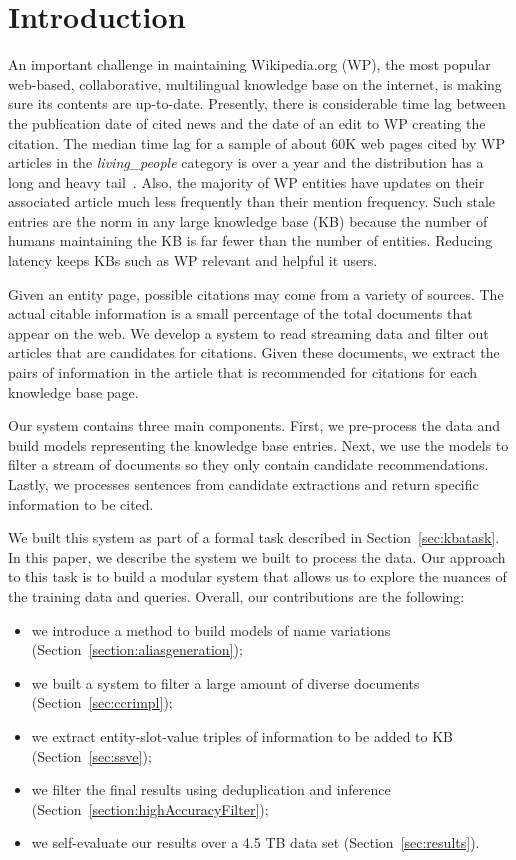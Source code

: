 
\section{Introduction}


An important challenge in maintaining Wikipedia.org (WP), the most popular 
web-based, collaborative, multilingual knowledge base on the internet, is  
making sure its contents are up-to-date. Presently, there is considerable time lag 
between the publication date of cited news and the date of an edit to WP 
creating the citation. The median time lag for a sample of about 60K
web pages cited by WP articles in the \textit{living\_people} category is over 
a year and the distribution has a long and heavy tail~\cite{JFrank12}. 
Also, the majority of WP entities have updates on their associated article much 
less frequently than their mention frequency. Such stale entries 
are the norm in any large knowledge base (KB) because the number of humans 
maintaining the KB is far fewer than the number of entities. 
Reducing latency keeps KBs such as WP relevant and helpful it users.

Given an entity page, possible citations may come from a variety of sources.
The actual citable information is a small percentage of the total documents that appear on the web.
We develop a system to read streaming data and filter out articles that are candidates for citations.
Given these documents, we extract the pairs of information in the 
article that is recommended for citations for each knowledge base page.

Our system contains three main components. First, we pre-process the data and
build models representing the knowledge base entries.
Next, we use the models to filter a stream of documents so they only contain 
candidate recommendations.
Lastly, we processes sentences from candidate extractions and return 
specific information to be cited.


We built this system as part of a formal task described in Section~\ref{sec:kbatask}.
In this paper, we describe the system we built to process the data.
Our approach to this task is to build a modular system
that allows us to explore the nuances of the training data and queries.
Overall, our contributions are the following:
\begin{itemize}[noitemsep,nolistsep]
\item we introduce a method to build models of name variations (Section~\ref{section:aliasgeneration});
\item we built a system to filter a large amount of diverse documents (Section~\ref{sec:ccrimpl});
\item we extract entity-slot-value triples of information to be added to KB (Section~\ref{sec:ssve});
\item we filter the final results using deduplication and inference (Section~\ref{section:highAccuracyFilter});
\item we self-evaluate our results over a 4.5 TB data set (Section~\ref{sec:results}).
\end{itemize}





